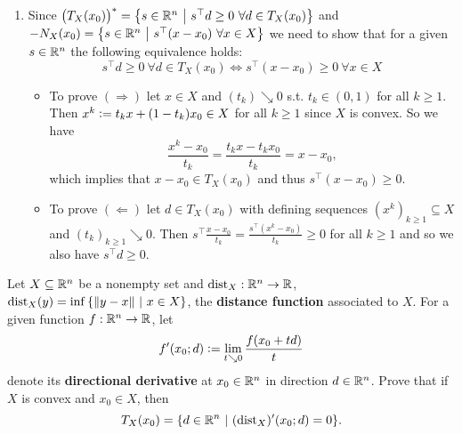 \begin{solution}
\begin{enumerate}
        \item Since \(\big(T_X(x_0)\big)^* = \left\{ s \in \mathbb{R}^n \ \middle| \ s^\top d \ge 0 \ \forall d \in T_X(x_0) \right\}\) and \(- N_X(x_0) = \set{s \in \R^n}{s^\top (x-x_0) \ \forall x \in X}\) we need to show that for a given \(s \in \mathbb{R}^n\) the following equivalence holds: \[s^\top d \ge 0 \ \forall d \in T_X(x_0) \iff s^\top (x - x_0) \ge 0 \ \forall x \in X \]
        \begin{itemize}
            \item To prove \((\Rightarrow)\) let \(x \in X\) and \((t_k) \searrow 0\) s.t. \(t_k \in (0, 1)\) for all \(k \ge 1\). Then \(x^k \mathrel{\mathop:}= t_k x + (1-t_k) x_0 \in X\) for all \(k \ge 1\) since \(X\) is convex. So we have \[\frac{x^k - x_0}{t_k} = \frac{t_k x - t_k x_0}{t_k} = x - x_0,\] which implies that \(x - x_0 \in T_X(x_0)\) and thus \(s^\top (x - x_0) \ge 0\).
            \item To prove \((\Leftarrow)\) let \(d \in T_X(x_0)\) with defining sequences \((x^k)_{k \ge 1} \subseteq X\) and \((t_k)_{k \ge 1} \searrow 0\). Then \(s^\top \frac{x - x_0}{t_k} = \frac{s^\top (x^k - x_0)}{t_k} \ge 0\) for all \(k \ge 1\) and so we also have \(s^\top d \ge 0\).
        \end{itemize}
    \end{enumerate}
\end{solution}

\begin{problem}
    Let \(X \subseteq \mathbb{R}^n\) be a nonempty set and \(\operatorname{dist}_X : \mathbb{R}^n \to \mathbb{R}\), \(\operatorname{dist}_X(y) = \inf\left\{ \left\| y-x \right\| \ \middle| \ x \in X \right\}\), the \textbf{distance function} associated to \(X\). For a given function \(f : \mathbb{R}^n \to \mathbb{R}\), let
    \[f'(x_0;d) \mathrel{\mathop:}= \lim_{t \searrow 0} \frac{f(x_0 + t d)}{t}\]
    denote its \textbf{directional derivative} at \(x_0 \in \mathbb{R}^n\) in direction \(d \in \mathbb{R}^n\). Prove that if \(X\) is convex and \(x_0 \in X\), then
    \[T_X(x_0) = \{ d \in \R^n \ | \ (\dist_X)'(x_0;d) = 0 \}.\]
\end{problem}

\begin{solution}
    
\end{solution}

